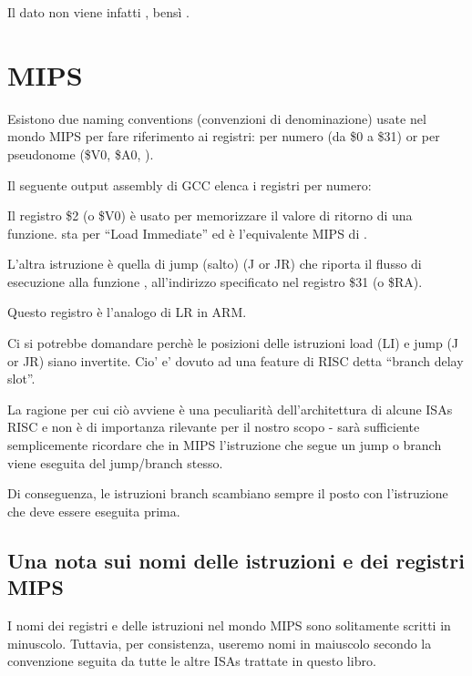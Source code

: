 Il dato non viene infatti , bensì .

\ifdefined\IncludeMIPS
\section{MIPS}

\label{MIPS_leaf_function_ex1}
Esistono due naming conventions (convenzioni di denominazione) usate nel mondo MIPS per fare riferimento ai registri: per numero (da \$0 a \$31) or per pseudonome (\$V0, \$A0, \etc{}).

Il seguente output assembly di GCC elenca i registri per numero:



\ITAph{}



Il registro \$2 (o \$V0) è usato per memorizzare il valore di ritorno di una funzione.
 sta per ``Load Immediate'' ed è l'equivalente MIPS di \MOV.

L'altra istruzione è quella di jump (salto) (J or JR) che riporta il flusso di esecuzione alla funzione ,  all'indirizzo specificato nel registro \$31 (o \$RA).

Questo registro è l'analogo di \ac{LR} in ARM.

Ci si potrebbe domandare perchè le posizioni delle istruzioni load (LI) e jump (J or JR) siano invertite. Cio' e' dovuto ad una feature di \ac{RISC} detta ``branch delay slot''.

La ragione per cui ciò avviene è una peculiarità dell'architettura di alcune \ac{ISA}s RISC e non è di importanza rilevante per il nostro scopo - sarà sufficiente semplicemente ricordare che in MIPS l'istruzione che segue un jump o branch viene eseguita  del jump/branch stesso.

Di conseguenza, le istruzioni branch scambiano sempre il posto con l'istruzione che deve essere eseguita prima.

\subsection{Una nota sui nomi delle istruzioni e dei registri MIPS}

I nomi dei registri e delle istruzioni nel mondo MIPS sono solitamente scritti in minuscolo. Tuttavia, per consistenza, useremo nomi in maiuscolo secondo la convenzione seguita da tutte le altre \ac{ISA}s trattate in questo libro.

\fi %

